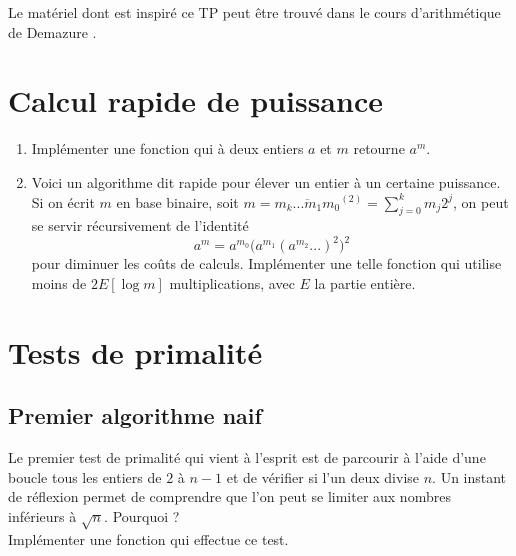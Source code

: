 
Le matériel dont est inspiré ce TP peut être trouvé dans le cours d'arithmétique de Demazure \cite{demazure}.\\

\section{Calcul rapide de puissance}

\begin{enumerate}
\item Implémenter une fonction qui à deux entiers $a$ et $m$ retourne $a^m$.
\item Voici un algorithme dit rapide pour élever un entier à un certaine puissance. Si on écrit $m$ en base binaire, soit $m=\overline{m_k ... m_1 m_0}^{(2)} = \sum_{j=0}^k m_j 2^j$, on peut se servir récursivement de l'identité
\[a^m = a^{m_0 }\big(a^{m_1}(a^{m_2}...)^2\big)^2\]
pour diminuer les coûts de calculs. Implémenter une telle fonction qui utilise moins de $2 E[\log m]$ multiplications, avec $E$ la partie entière.
\end{enumerate}

\section{Tests de primalité}

\subsection{Premier algorithme naif} 
Le premier test de primalité qui vient à l'esprit est de parcourir à l'aide d'une boucle tous les entiers de $2$ à $n-1$ et de vérifier si l'un deux divise $n$. Un instant de réflexion permet de comprendre que l'on peut se limiter aux nombres inférieurs à $\sqrt n$. Pourquoi ?\\ 
Implémenter une fonction qui effectue ce test.

